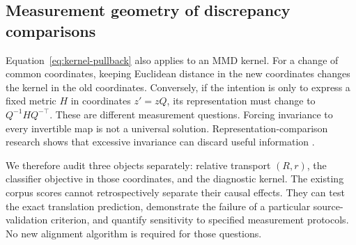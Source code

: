 \subsection{Measurement geometry of discrepancy comparisons}
\label{sec:audit-measurement}

Equation~\ref{eq:kernel-pullback} also applies to an MMD kernel. For a change
of common coordinates, keeping Euclidean distance in the new coordinates
changes the kernel in the old coordinates. Conversely, if the intention is
only to express a fixed metric $H$ in coordinates $z'=zQ$, its representation
must change to $Q^{-1}HQ^{-\top}$. These are different measurement questions.
Forcing invariance to every invertible map is not a universal solution.
Representation-comparison research shows that excessive invariance can discard
useful information \cite{kornblith2019similarity}.

We therefore audit three objects separately: relative transport $(R,r)$,
the classifier objective in those coordinates, and the diagnostic kernel.
The existing corpus scores cannot retrospectively separate their causal
effects. They can test the exact translation prediction, demonstrate the
failure of a particular source-validation criterion, and quantify sensitivity
to specified measurement protocols. No new alignment algorithm is required
for those questions.

